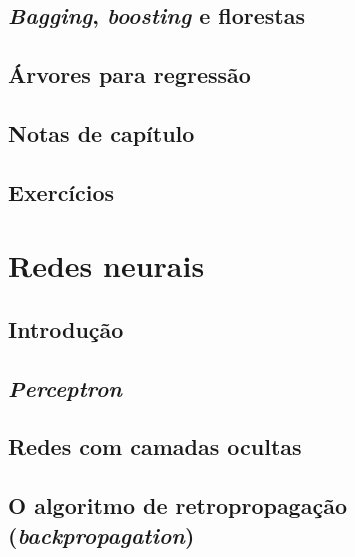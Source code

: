 \documentclass[
]{latex/krantz}
\theoremstyle{definition}
\theoremstyle{definition}
\theoremstyle{definition}
\theoremstyle{definition}
\theoremstyle{remark}
\begin{document}
\hypertarget{bagging-boosting-e-florestas}{%
\section{\texorpdfstring{\emph{Bagging}, \emph{boosting} e florestas}{Bagging, boosting e florestas}}\label{bagging-boosting-e-florestas}}

\hypertarget{uxe1rvores-para-regressuxe3o}{%
\section{Árvores para regressão}\label{uxe1rvores-para-regressuxe3o}}

\hypertarget{notas-de-capuxedtulo-9}{%
\section{Notas de capítulo}\label{notas-de-capuxedtulo-9}}

\hypertarget{exercuxedcios-9}{%
\section{Exercícios}\label{exercuxedcios-9}}

\hypertarget{redes-neurais}{%
\chapter{Redes neurais}\label{redes-neurais}}

\hypertarget{introduuxe7uxe3o-10}{%
\section{Introdução}\label{introduuxe7uxe3o-10}}

\hypertarget{perceptron}{%
\section{\texorpdfstring{\emph{Perceptron}}{Perceptron}}\label{perceptron}}

\hypertarget{redes-com-camadas-ocultas}{%
\section{Redes com camadas ocultas}\label{redes-com-camadas-ocultas}}

\hypertarget{o-algoritmo-de-retropropagauxe7uxe3o-backpropagation}{%
\section{\texorpdfstring{O algoritmo de retropropagação (\emph{backpropagation})}{O algoritmo de retropropagação (backpropagation)}}\label{o-algoritmo-de-retropropagauxe7uxe3o-backpropagation}}
\end{document}
